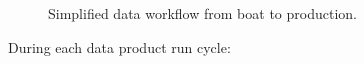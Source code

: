 \documentclass[
  letterpaper,
  oneside,
  open=any]{scrbook}
\begin{document}
\begin{figure}


\caption{\label{fig-workflow}Simplified data workflow from boat to
production.}

\end{figure}%

During each data product run cycle:
\end{document}
